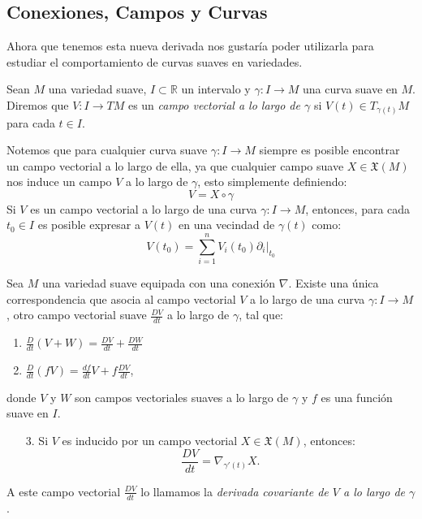 \subsection{Conexiones, Campos y Curvas}
\label{Subsección: Conexiones Campos y Curvas}

Ahora que tenemos esta nueva derivada nos gustaría poder utilizarla para estudiar el comportamiento de curvas suaves en variedades.

\begin{definition}
	Sean $M$ una variedad suave, $I \subset \mathbb{R}$ un intervalo y $\gamma: I \to M$ una curva suave en $M$. Diremos que $V: I \to TM$ es un \textit{campo vectorial a lo largo de $\gamma$} si $V(t) \in T_{\gamma(t)}M$ para cada $t \in I$.
\end{definition}

Notemos que para cualquier curva suave $\gamma: I \to M$ siempre es posible encontrar un campo vectorial a lo largo de ella, ya que cualquier campo suave $X \in \mathfrak{X}(M)$ nos induce un campo $V$ a lo largo de $\gamma$, esto simplemente definiendo:
\[
	V = X \circ \gamma
\]
Si $V$ es un campo vectorial a lo largo de una curva $\gamma: I \to M$, entonces, para cada $t_{0} \in I$ es posible expresar a $V(t)$ en una vecindad de $\gamma(t)$ como:
\[
	V(t_{0}) = \sum_{i=1}^{n} V_{i}(t_{0}) \partial_{i} |_{t_{0}}
\]

\begin{lemma}
	Sea $M$ una variedad suave equipada con una conexión $\nabla$. Existe una única correspondencia que asocia al campo vectorial $V$ a lo largo de una curva $\gamma: I \to M$, otro campo vectorial suave $\frac{DV}{dt}$ a lo largo de $\gamma$, tal que:
	\begin{enumerate}
		\item $\frac{D}{dt}(V+W) = \frac{DV}{dt}  + \frac{DW}{dt}$
		\item $\frac{D}{dt}(fV)  = \frac{df}{dt}V + f\frac{DV}{dt}$,
	\end{enumerate}
	donde $V$ y $W$ son campos vectoriales suaves a lo largo de $\gamma$ y $f$ es una función suave en $I$.
	\begin{enumerate}
		\item[3.] Si $V$ es inducido por un campo vectorial $X \in \mathfrak{X}(M)$, entonces:
			\[
				\frac{DV}{dt} = \nabla_{\gamma'(t)}X.
			\]
	\end{enumerate}
	A este campo vectorial $\frac{DV}{dt}$ lo llamamos la \textit{derivada covariante de $V$ a lo largo de $\gamma$}.
\end{lemma}

